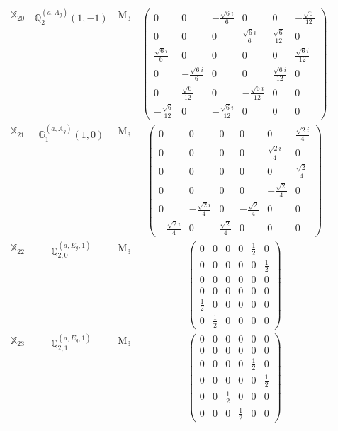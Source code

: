 \documentclass[fleqn,10pt,landscape]{article}
\begin{document}
\begin{itemize}
\begin{center}
\begin{longtable}{c|c|c|c}
$ \mathbb{X}_{20} $ & $\mathbb{Q}_{2}^{(a,A_{g})}(1,-1)$ & M$_{3}$ & $\begin{pmatrix} 0 & 0 & - \frac{\sqrt{6} i}{6} & 0 & 0 & - \frac{\sqrt{6}}{12} \\ 0 & 0 & 0 & \frac{\sqrt{6} i}{6} & \frac{\sqrt{6}}{12} & 0 \\ \frac{\sqrt{6} i}{6} & 0 & 0 & 0 & 0 & \frac{\sqrt{6} i}{12} \\ 0 & - \frac{\sqrt{6} i}{6} & 0 & 0 & \frac{\sqrt{6} i}{12} & 0 \\ 0 & \frac{\sqrt{6}}{12} & 0 & - \frac{\sqrt{6} i}{12} & 0 & 0 \\ - \frac{\sqrt{6}}{12} & 0 & - \frac{\sqrt{6} i}{12} & 0 & 0 & 0 \end{pmatrix}$ \\
$ \mathbb{X}_{21} $ & $\mathbb{G}_{1}^{(a,A_{g})}(1,0)$ & M$_{3}$ & $\begin{pmatrix} 0 & 0 & 0 & 0 & 0 & \frac{\sqrt{2} i}{4} \\ 0 & 0 & 0 & 0 & \frac{\sqrt{2} i}{4} & 0 \\ 0 & 0 & 0 & 0 & 0 & \frac{\sqrt{2}}{4} \\ 0 & 0 & 0 & 0 & - \frac{\sqrt{2}}{4} & 0 \\ 0 & - \frac{\sqrt{2} i}{4} & 0 & - \frac{\sqrt{2}}{4} & 0 & 0 \\ - \frac{\sqrt{2} i}{4} & 0 & \frac{\sqrt{2}}{4} & 0 & 0 & 0 \end{pmatrix}$ \\
$ \mathbb{X}_{22} $ & $\mathbb{Q}_{2,0}^{(a,E_{g},1)}$ & M$_{3}$ & $\begin{pmatrix} 0 & 0 & 0 & 0 & \frac{1}{2} & 0 \\ 0 & 0 & 0 & 0 & 0 & \frac{1}{2} \\ 0 & 0 & 0 & 0 & 0 & 0 \\ 0 & 0 & 0 & 0 & 0 & 0 \\ \frac{1}{2} & 0 & 0 & 0 & 0 & 0 \\ 0 & \frac{1}{2} & 0 & 0 & 0 & 0 \end{pmatrix}$ \\
$ \mathbb{X}_{23} $ & $\mathbb{Q}_{2,1}^{(a,E_{g},1)}$ & M$_{3}$ & $\begin{pmatrix} 0 & 0 & 0 & 0 & 0 & 0 \\ 0 & 0 & 0 & 0 & 0 & 0 \\ 0 & 0 & 0 & 0 & \frac{1}{2} & 0 \\ 0 & 0 & 0 & 0 & 0 & \frac{1}{2} \\ 0 & 0 & \frac{1}{2} & 0 & 0 & 0 \\ 0 & 0 & 0 & \frac{1}{2} & 0 & 0 \end{pmatrix}$ \\

\end{longtable}
\end{center}
\end{itemize}
\end{document}
